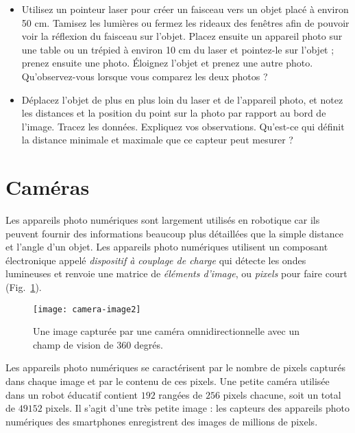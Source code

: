 \begin{framed}

\begin{itemize}
\item Utilisez un pointeur laser pour créer un faisceau vers un objet placé à environ 50 cm. Tamisez les lumières ou fermez les rideaux des fenêtres afin de pouvoir voir la réflexion du faisceau sur l'objet. Placez ensuite un appareil photo sur une table ou un trépied à environ 10 cm du laser et pointez-le sur l'objet ; prenez ensuite une photo. Éloignez l'objet et prenez une autre photo. Qu'observez-vous lorsque vous comparez les deux photos ?
\item Déplacez l'objet de plus en plus loin du laser et de l'appareil photo, et notez les distances et la position du point sur la photo par rapport au bord de l'image. Tracez les données. Expliquez vos observations. Qu'est-ce qui définit la distance minimale et maximale que ce capteur peut mesurer ?
\end{itemize}
\end{framed}

\section{Caméras}\label{s.cameras}

Les appareils photo numériques sont largement utilisés en robotique car ils peuvent fournir des informations beaucoup plus détaillées que la simple distance et l'angle d'un objet. Les appareils photo numériques utilisent un composant électronique appelé \emph{dispositif à couplage de charge} qui détecte les ondes lumineuses et renvoie une matrice de \emph{éléments d'image}, ou \emph{pixels} pour faire court (Fig.~\ref{fig.camera}).

\begin{figure}
\texttt{[image: camera-image2]}
\caption{Une image capturée par une caméra omnidirectionnelle avec un champ de vision de 360 degrés.}\label{fig.camera}
\end{figure}

Les appareils photo numériques se caractérisent par le nombre de pixels capturés dans chaque image et par le contenu de ces pixels. Une petite caméra utilisée dans un robot éducatif contient $192$ rangées de $256$ pixels chacune, soit un total de $49 152$ pixels. Il s'agit d'une très petite image : les capteurs des appareils photo numériques des smartphones enregistrent des images de millions de pixels.

